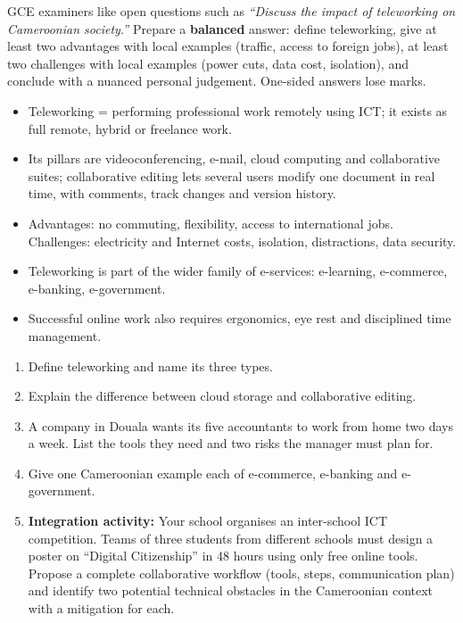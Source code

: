 \documentclass[11pt]{article}
\newcommand{\cle}[1]{{\popxbold\color{popdark}#1}}
\begin{document}
\begin{attention}
GCE examiners like open questions such as \emph{``Discuss the impact of teleworking on Cameroonian society.''} Prepare a \textbf{balanced} answer: define teleworking, give at least two advantages with local examples (traffic, access to foreign jobs), at least two challenges with local examples (power cuts, data cost, isolation), and conclude with a nuanced personal judgement. One-sided answers lose marks.
\end{attention}

\begin{aretenir}
\begin{itemize}
\item \cle{Teleworking} = performing professional work remotely using ICT; it exists as full remote, hybrid or freelance work.
\item Its pillars are videoconferencing, e-mail, \cle{cloud computing} and collaborative suites; \cle{collaborative editing} lets several users modify one document in real time, with comments, track changes and version history.
\item Advantages: no commuting, flexibility, access to international jobs. Challenges: electricity and Internet costs, isolation, distractions, data security.
\item Teleworking is part of the wider family of e-services: \cle{e-learning}, \cle{e-commerce}, \cle{e-banking}, \cle{e-government}.
\item Successful online work also requires ergonomics, eye rest and disciplined time management.
\end{itemize}
\end{aretenir}

\begin{exercice}
\begin{enumerate}
\item Define teleworking and name its three types.
\item Explain the difference between cloud storage and collaborative editing.
\item A company in Douala wants its five accountants to work from home two days a week. List the tools they need and two risks the manager must plan for.
\item Give one Cameroonian example each of e-commerce, e-banking and e-government.
\item \textbf{Integration activity:} Your school organises an inter-school ICT competition. Teams of three students from different schools must design a poster on ``Digital Citizenship'' in 48 hours using only free online tools. Propose a complete collaborative workflow (tools, steps, communication plan) and identify two potential technical obstacles in the Cameroonian context with a mitigation for each.
\end{enumerate}
\end{exercice}
\end{document}
